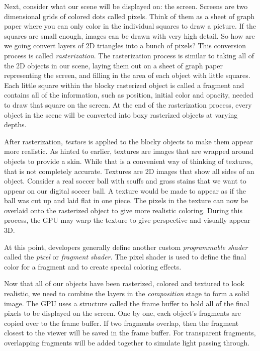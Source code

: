 \documentclass[12pt] {article}
\begin{document}
Next, consider what our scene will be displayed on: the screen. Screens are two dimensional grids of colored dots called pixels. Think of them as a sheet of graph paper where you can only color in the individual squares to draw a picture. If the squares are small enough, images can be drawn with very high detail. So how are we going convert layers of 2D triangles into a bunch of pixels? This conversion process is called \emph{rasterization}. The rasterization process is similar to taking all of the 2D objects in our scene, laying them out on a sheet of graph paper representing the screen, and filling in the area of each object with little squares. Each little square within the blocky rasterized object is called a fragment and contains all of the information, such as position, initial color and opacity, needed to draw that square on the screen. At the end of the rasterization process, every object in the scene will be converted into boxy rasterized objects at varying depths.

After rasterization, \emph{texture} is applied to the blocky objects to make them appear more realistic. As hinted to earlier, textures are images that are wrapped around objects to provide a skin. While that is a convenient way of thinking of textures, that is not completely accurate. Textures are 2D images that show all sides of an object. Consider a real soccer ball with scuffs and grass stains that we want to appear on our digital soccer ball. A texture would be made to appear as if the ball was cut up and laid flat in one piece. The pixels in the texture can now be overlaid onto the rasterized object to give more realistic coloring. During this process, the GPU may warp the texture to give perspective and visually appear 3D.

At this point, developers generally define another custom \emph{programmable shader} called the \emph{pixel} or \emph{fragment shader}. The pixel shader is used to define the final color for a fragment and to create special coloring effects. 

Now that all of our objects have been rasterized, colored and textured to look realistic, we need to combine the layers in the \emph{composition} stage to form a solid image. The GPU uses a structure called the frame buffer to hold all of the final pixels to be displayed on the screen. One by one, each object's fragments are copied over to the frame buffer. If two fragments overlap, then the fragment closest to the viewer will be saved in the frame buffer. For transparent fragments, overlapping fragments will be added together to simulate light passing through.
\end{document}
